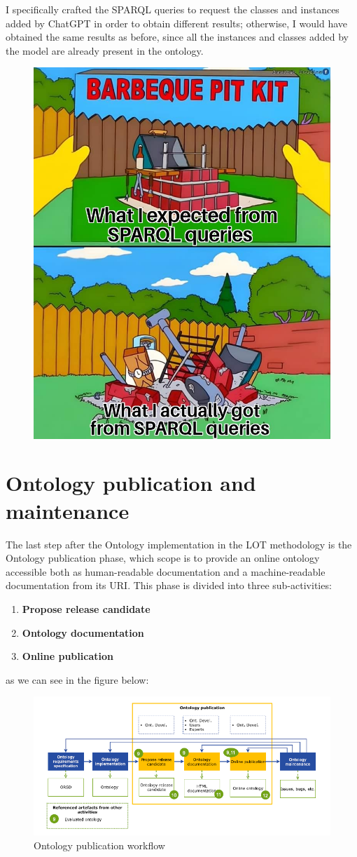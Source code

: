 I specifically crafted the SPARQL queries to request the classes and instances added by ChatGPT in order to obtain different results; otherwise, I would have obtained the same results as before, since all the instances and classes added by the model are already present in the ontology.

\begin{figure}[H]
    \centering
    \includegraphics[width=0.6\linewidth]{Figures/fig_76.jpg}
\end{figure}


\newpage
\section{Ontology publication and maintenance}
The last step after the Ontology implementation in the LOT methodology is the Ontology publication phase, which scope is to provide an online ontology accessible both as human-readable documentation and a machine-readable documentation from its URI. This phase is divided into three sub-activities:
\begin{enumerate}
    \item \textbf{Propose release candidate}
    \item \textbf{Ontology documentation}
    \item \textbf{Online publication}
\end{enumerate}
as we can see in the figure below:
\begin{figure}[H]
    \centering
    \includegraphics[width=0.9\linewidth]{Figures/fig_25.png}
    \caption{Ontology publication workflow}
    \label{fig:enter-label}
\end{figure}

